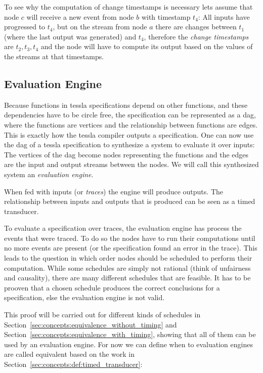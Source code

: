 To see why the computation of change timestamps is necessary lets assume that node \(c\) will receive a new event from node \(b\) with timestamp \(t_4\):
All inputs have progressed to \(t_4\), but on the stream from node \(a\) there are changes between \(t_1\) (where the last output was generated) and \(t_4\), therefore the \emph{change timestamps} are \(t_2, t_3, t_4\) and the node will have to compute its output based on the values of the streams at that timestamps.

\subsection{ Evaluation Engine}
\label{sec:concepts:def:eval_engine}

Because functions in \gls{tessla} specifications depend on other functions, and these dependencies have to be circle free, the specification can be represented as a \gls{dag}, where the functions are vertices and the relationship between functions are edges.
This is exactly how the \gls{tessla} compiler outputs a specification.
One can now use the \gls{dag} of a \gls{tessla} specification to synthesize a system to evaluate it over inputs:
The vertices of the \gls{dag} become nodes representing the functions and the edges are the input and output streams between the nodes.
We will call this synthesized system an \emph{evaluation engine}.

When fed with inputs (or \emph{traces}) the engine will produce outputs.
The relationship between inputs and outputs that is produced can be seen as a timed transducer.

To evaluate a specification over traces, the evaluation engine has process the events that were traced.
To do so the nodes have to run their computations until no more events are present (or the specification found an error in the trace).
This leads to the question in which order nodes should be scheduled to perform their computation.
While some schedules are simply not rational (think of unfairness and causality), there are many different schedules that are feasible.
It has to be prooven that a chosen schedule produces the correct conclusions for a specification, else the evaluation engine is not valid.

This proof will be carried out for different kinds of schedules in Section~\ref{sec:concepts:equivalence_without_timing} and Section~\ref{sec:concepts:equivalence_with_timing}, showing that all of them can be used by an evaluation engine.
For now we can define when to evaluation engines are called equivalent based on the work in Section~\ref{sec:concepts:def:timed_transducer}:

